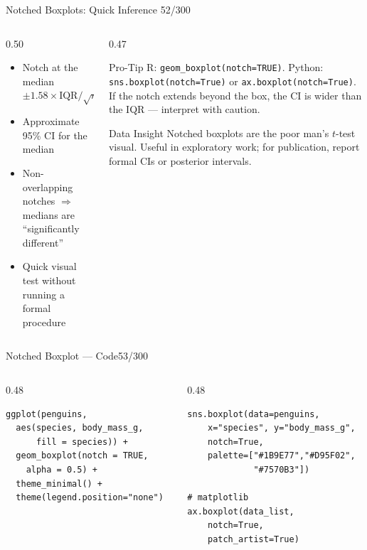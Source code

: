 \documentclass[10pt]{beamer}
\newcommand{\smark}[1]{\hfill{\scriptsize\color{codegray}#1}}
\begin{document}
\begin{frame}{Notched Boxplots: Quick Inference}
\smark{52/300}
\begin{columns}[T]
\begin{column}{0.50\textwidth}
\begin{itemize}
    \item Notch at the median $\pm 1.58 \times \text{IQR} / \sqrt{n}$
    \item Approximate 95\% CI for the median
    \item Non-overlapping notches $\Rightarrow$ medians are ``significantly different''
    \item Quick visual test without running a formal procedure
\end{itemize}
\end{column}
\begin{column}{0.47\textwidth}
\begin{alertblock}{Pro-Tip}
    \scriptsize R: \texttt{geom\_boxplot(notch=TRUE)}. Python: \texttt{sns.boxplot(notch=True)} or \texttt{ax.boxplot(notch=True)}. If the notch extends beyond the box, the CI is wider than the IQR --- interpret with caution.
\end{alertblock}
\vspace{0.2cm}
\begin{exampleblock}{Data Insight}
    \scriptsize Notched boxplots are the poor man's $t$-test visual. Useful in exploratory work; for publication, report formal CIs or posterior intervals.
\end{exampleblock}
\end{column}
\end{columns}
\end{frame}

\begin{frame}[fragile]{Notched Boxplot --- Code}\smark{53/300}
\begin{columns}[T]
\begin{column}{0.48\textwidth}
\begin{lstlisting}[style=Rstyle]
ggplot(penguins,
  aes(species, body_mass_g,
      fill = species)) +
  geom_boxplot(notch = TRUE,
    alpha = 0.5) +
  theme_minimal() +
  theme(legend.position="none")
\end{lstlisting}
\end{column}
\begin{column}{0.48\textwidth}
\begin{lstlisting}[style=Pystyle]
sns.boxplot(data=penguins,
    x="species", y="body_mass_g",
    notch=True,
    palette=["#1B9E77","#D95F02",
             "#7570B3"])

# matplotlib
ax.boxplot(data_list,
    notch=True,
    patch_artist=True)
\end{lstlisting}
\end{column}
\end{columns}
\end{frame}
\end{document}
